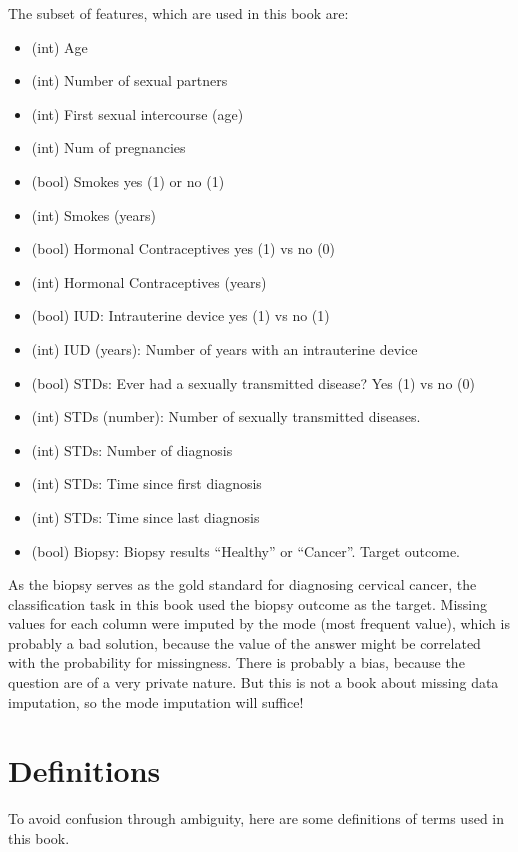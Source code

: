 \documentclass[12pt,]{krantz}
\providecommand{\tightlist}{%
  \setlength{\itemsep}{0pt}\setlength{\parskip}{0pt}}
\theoremstyle{definition}
\theoremstyle{definition}
\theoremstyle{definition}
\theoremstyle{remark}
\begin{document}
The subset of features, which are used in this book are:

\begin{itemize}
\tightlist
\item
  (int) Age
\item
  (int) Number of sexual partners
\item
  (int) First sexual intercourse (age)
\item
  (int) Num of pregnancies
\item
  (bool) Smokes yes (1) or no (1)
\item
  (int) Smokes (years)
\item
  (bool) Hormonal Contraceptives yes (1) vs no (0)
\item
  (int) Hormonal Contraceptives (years)
\item
  (bool) IUD: Intrauterine device yes (1) vs no (1)
\item
  (int) IUD (years): Number of years with an intrauterine device
\item
  (bool) STDs: Ever had a sexually transmitted disease? Yes (1) vs no
  (0)
\item
  (int) STDs (number): Number of sexually transmitted diseases.
\item
  (int) STDs: Number of diagnosis
\item
  (int) STDs: Time since first diagnosis
\item
  (int) STDs: Time since last diagnosis
\item
  (bool) Biopsy: Biopsy results ``Healthy'' or ``Cancer''. Target
  outcome.
\end{itemize}

As the biopsy serves as the gold standard for diagnosing cervical
cancer, the classification task in this book used the biopsy outcome as
the target. Missing values for each column were imputed by the mode
(most frequent value), which is probably a bad solution, because the
value of the answer might be correlated with the probability for
missingness. There is probably a bias, because the question are of a
very private nature. But this is not a book about missing data
imputation, so the mode imputation will suffice!

\chapter{Definitions}\label{definitions}

To avoid confusion through ambiguity, here are some definitions of terms
used in this book.
\end{document}
